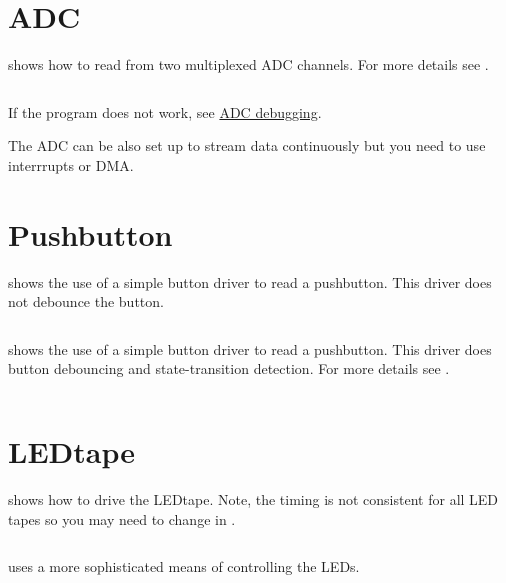 \section{ADC}
\label{ADC}

 shows
how to read from two multiplexed ADC channels.  For more details see
.

\inputminted{C}{../../src/test-apps/adc_usb_serial_test2/adc_usb_serial_test2.c}

If the program does not work, see  \hyperref[debugging-adc]{ADC debugging}.

The ADC can be also set up to stream data continuously but you need to
use interrrupts or DMA.


\section{Pushbutton}
\label{pushbutton}

 shows the use of a
simple button driver to read a pushbutton.  This driver does not debounce the button.

\inputminted{C}{../../src/test-apps/button_test1/button_test1.c}

 shows the use of a
simple button driver to read a pushbutton.  This driver does button
debouncing and state-transition detection.  For more details see
.

\inputminted{C}{../../src/test-apps/button_test2/button_test2.c}


\section{LEDtape}
\label{ledtape}

 shows how to drive the
LEDtape.  Note, the timing is not consistent for all LED tapes so you
may need to change  in .

\inputminted{C}{../../src/test-apps/ledtape_test1/ledtape_test1.c}


 uses a more
sophisticated means of controlling the LEDs.

\inputminted{C}{../../src/test-apps/ledtape_test2/ledtape_test2.c}
